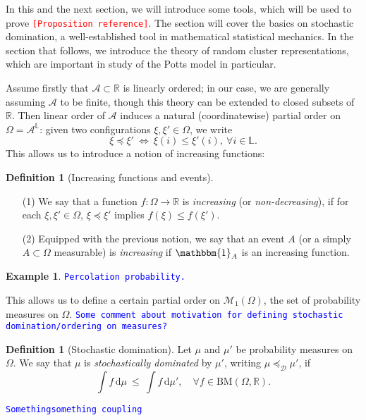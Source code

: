 \documentclass[12pt]{article}
\newcommand{\A}{\mathcal{A}}
\newcommand{\D}{\mathcal{D}}
\renewcommand{\d}{\mathrm{d}}
\renewcommand{\L}{\mathbb{L}}
\newcommand{\M}{\mathcal{M}}
\newcommand{\R}{\mathbb{R}}
\newcommand{\BM}{\mathrm{BM}}
\newcommand{\ra}{\rightarrow}
\newcommand{\1}{\mathbbm{1}}
\newcommand{\5}{\vspace{0.5cm}}
\theoremstyle{definition}
\newtheorem{ex}[thm]{Example}
\newtheorem{df}[thm]{Definition}
\begin{document}
In this and the next section, we will introduce some tools, which will be used to prove \textcolor{red}{\texttt{[Proposition reference]}}. The section will cover the basics on stochastic domination, a well-established tool in mathematical statistical mechanics. In the section that follows, we introduce the theory of random cluster representations, which are important in study of the Potts model in particular. 


Assume firstly that $\A\subset\R$ is linearly ordered; in our case, we are generally assuming $\A$ to be finite, though this theory can be extended to closed subsets of $\R$. Then linear order of $\A$ induces a natural (coordinatewise) partial order on $\Omega=\A^\L$: given two configurations $\xi,\xi'\in\Omega$, we write
$$\xi\preceq\xi' ~\iff~ \xi(i)\leq\xi'(i),~\forall i\in\L.$$
This allows us to introduce a notion of increasing functions:

\begin{df}[Increasing functions and events]
~
\begin{itemize}
	\item[(1)] We say that a function $f:\Omega\ra\R$ is \textit{increasing} (or \textit{non-decreasing}), if for each $\xi,\xi'\in\Omega$, $\xi\preceq\xi'$ implies $f(\xi)\leq f(\xi')$. 
	\item[(2)] Equipped with the previous notion, we say that an event $A$ (or a simply $A\subset\Omega$ measurable) is \textit{increasing} if $\1_A$ is an increasing function.
\end{itemize}
\end{df}

\begin{ex}
\textcolor{blue}{\texttt{Percolation probability.}}
\end{ex}

 This allows us to define a certain partial order on $\M_1(\Omega)$, the set of probability measures on $\Omega$. \textcolor{blue}{\texttt{Some comment about motivation for defining stochastic domination/ordering on measures?}}
 
\begin{df}[Stochastic domination]
Let $\mu$ and $\mu'$ be probability measures on $\Omega$. We say that $\mu$ is \textit{stochastically dominated} by $\mu'$, writing $\mu\preceq_\D\mu'$, if
$$\int f\,\d\mu ~\leq~ \int f\,\d\mu', \quad \forall f\in\BM(\Omega,\R).$$
\end{df}

\textcolor{blue}{\texttt{Somethingsomething coupling}}
\end{document}
